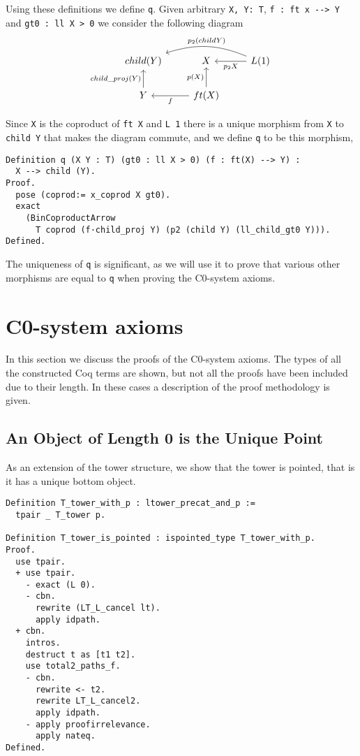 Using these definitions we define \lstinline|q|. Given arbitrary 
\lstinline|X, Y: T|, \lstinline|f : ft x --> Y| and \lstinline|gt0 : ll X > 0| 
we consider the following diagram
\[
\begin{tikzcd}
    child(Y) &
    X & 
    L(1)
    \ar[l, "p_2 X"]
    \ar[ll, bend right=20, "p_2 (child Y)"'] \\
    Y
    \ar[u, "child\_proj(Y)"] &
    ft(X)
    \ar[u, "p(X)"]
    \ar[l, "f"] &
\end{tikzcd}
\]

Since \lstinline|X| is the coproduct of \lstinline|ft X| and \lstinline|L 1|
there is a unique morphism from \lstinline|X| to \lstinline|child Y| that makes
the diagram commute, and we define \lstinline|q| to be this morphism,
\begin{lstlisting}
Definition q (X Y : T) (gt0 : ll X > 0) (f : ft(X) --> Y) :
  X --> child (Y).
Proof.
  pose (coprod:= x_coprod X gt0).
  exact 
    (BinCoproductArrow 
      T coprod (f·child_proj Y) (p2 (child Y) (ll_child_gt0 Y))).
Defined.
\end{lstlisting}

The uniqueness of \lstinline|q| is significant, as we will use it to prove that
various other morphisms are equal to \lstinline|q| when proving the C0-system
axioms.

\section{C0-system axioms}
In this section we discuss the proofs of the C0-system axioms. The types of all
the constructed Coq terms are shown, but not all the proofs have been included
due to their length. In these cases a description of the proof methodology is
given.

\subsection{An Object of Length 0 is the Unique Point}
As an extension of the tower structure, we show that the tower is pointed, that
is it has a unique bottom object. 

\begin{lstlisting}
Definition T_tower_with_p : ltower_precat_and_p := 
  tpair _ T_tower p.

Definition T_tower_is_pointed : ispointed_type T_tower_with_p.
Proof.
  use tpair.
  + use tpair.
    - exact (L 0).
    - cbn.
      rewrite (LT_L_cancel lt).
      apply idpath.
  + cbn.
    intros.
    destruct t as [t1 t2].
    use total2_paths_f.
    - cbn.
      rewrite <- t2.
      rewrite LT_L_cancel2.
      apply idpath.
    - apply proofirrelevance.
      apply nateq.
Defined.
\end{lstlisting}

